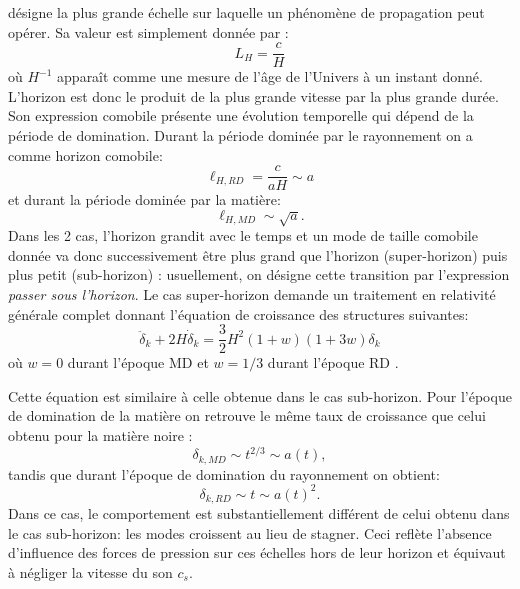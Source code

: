  désigne la plus grande échelle sur laquelle un phénomène de propagation peut opérer. Sa valeur est simplement donnée par :
\begin{equation}
L_H=\frac{c}{H}
\end{equation}
où $H^{-1}$ apparaît comme une mesure de l'âge de l'Univers à un instant donné. L'horizon est donc le produit de la plus grande vitesse par la plus grande durée. Son expression comobile présente une évolution temporelle qui dépend de la période de domination. Durant la période dominée par le rayonnement on a comme horizon comobile:
\begin{equation}
\ell_{H,RD}=\frac{c}{aH}\sim a
\end{equation} 
et durant la période dominée par la matière:
\begin{equation}
\ell_{H,MD}\sim\sqrt{a}.
\end{equation}
Dans les 2 cas, l'horizon grandit avec le temps et un mode de taille comobile donnée va donc successivement être plus grand que l'horizon (super-horizon) puis plus petit (sub-horizon) : usuellement, on désigne cette transition par l'expression \textit{passer sous l'horizon}. Le cas super-horizon demande un traitement en relativité générale complet donnant l'équation de croissance des structures suivantes:
\begin{equation}
\ddot \delta_k + 2H \dot \delta_k = \frac{3}{2}H^2(1+w)(1+3w)\delta_k
\end{equation}
où $w=0$ durant l'époque MD et $w=1/3$ durant l'époque RD . 

Cette équation est similaire à celle obtenue dans le cas sub-horizon. Pour l'époque de domination de la matière on retrouve le même taux de croissance que celui obtenu pour la matière noire :
\begin{equation}
\delta_{k,MD}\sim t^{2/3}\sim a(t),
\end{equation}
tandis que durant l'époque de domination du rayonnement on obtient:
\begin{equation}
\delta_{k,RD}\sim t \sim a(t)^2.
\end{equation}
Dans ce cas, le comportement est substantiellement différent de celui obtenu dans le cas sub-horizon: les modes croissent au lieu de stagner. Ceci reflète l'absence d'influence des forces de pression sur ces échelles hors de leur horizon et équivaut à négliger la vitesse du son $c_s$.

